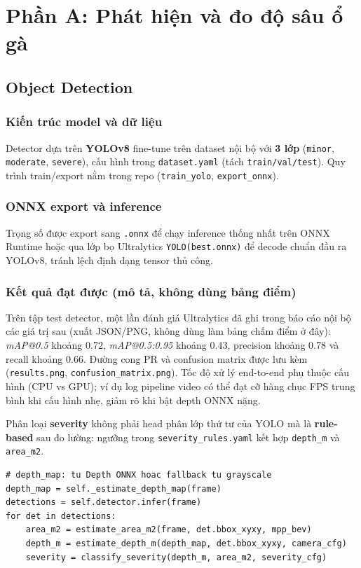 \documentclass[12pt,a4paper]{article}
\begin{document}
\section{Phần A: Phát hiện và đo độ sâu ổ gà}

\subsection{Object Detection}
\subsubsection*{Kiến trúc model và dữ liệu}
Detector dựa trên \textbf{YOLOv8} fine-tune trên dataset nội bộ với \textbf{3 lớp} (\texttt{minor}, \texttt{moderate}, \texttt{severe}), cấu hình trong \texttt{dataset.yaml} (tách \texttt{train/val/test}). Quy trình train/export nằm trong repo (\texttt{train\_yolo}, \texttt{export\_onnx}).

\subsubsection*{ONNX export và inference}
Trọng số được export sang \texttt{.onnx} để chạy inference thống nhất trên ONNX Runtime hoặc qua lớp bọ Ultralytics \texttt{YOLO(best.onnx)} để decode chuẩn đầu ra YOLOv8, tránh lệch định dạng tensor thủ công.

\subsubsection*{Kết quả đạt được (mô tả, không dùng bảng điểm)}
Trên tập test detector, một lần đánh giá Ultralytics đã ghi trong báo cáo nội bộ các giá trị sau (xuất JSON/PNG, không dùng làm bảng chấm điểm ở đây): \emph{mAP@0.5} khoảng $0.72$, \emph{mAP@0.5:0.95} khoảng $0.43$, precision khoảng $0.78$ và recall khoảng $0.66$. Đường cong PR và confusion matrix được lưu kèm (\texttt{results.png}, \texttt{confusion\_matrix.png}). Tốc độ xử lý end-to-end phụ thuộc cấu hình (CPU vs GPU); ví dụ log pipeline video có thể đạt cỡ hàng chục FPS trung bình khi cấu hình nhẹ, giảm rõ khi bật depth ONNX nặng.

Phân loại \textbf{severity} không phải head phân lớp thứ tư của YOLO mà là \textbf{rule-based} sau đo lường: ngưỡng trong \texttt{severity\_rules.yaml} kết hợp \texttt{depth\_m} và \texttt{area\_m2}.

\begin{lstlisting}[caption={Luồng xử lý cốt lõi theo frame (rút gọn từ \texttt{PotholePipeline})}]
# depth_map: tu Depth ONNX hoac fallback tu grayscale
depth_map = self._estimate_depth_map(frame)
detections = self.detector.infer(frame)
for det in detections:
    area_m2 = estimate_area_m2(frame, det.bbox_xyxy, mpp_bev)
    depth_m = estimate_depth_m(depth_map, det.bbox_xyxy, camera_cfg)
    severity = classify_severity(depth_m, area_m2, severity_cfg)
\end{lstlisting}
\end{document}
